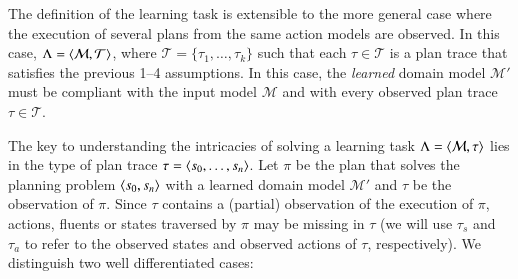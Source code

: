 The definition of the learning task is extensible to the more general case where the execution of several plans from the same action models are observed. In this case, $\Lambda={\langle \mathcal{M},\mathcal{T} \rangle}$, where $\mathcal{T}=\{\tau_1,\ldots,\tau_{k}\}$ such that each $\tau\in \mathcal{T}$ is a plan trace that satisfies the previous 1--4 assumptions. In this case, the {\em learned} domain model $\mathcal{M}'$ must be compliant with the input model $\mathcal{M}$ and with every observed plan trace $\tau\in \mathcal{T}$.

\vspace{0.15cm}

\textcolor[rgb]{1.00,0.00,0.00}{The key to understanding the intricacies of solving a learning task $\Lambda={\langle \mathcal{M},\tau \rangle}$ lies in the type of plan trace $\tau = {\langle s_0, \ldots, s_n \rangle}$. Let $\pi$ be the plan that solves the planning problem ${\langle s_0,s_n \rangle}$ with a learned domain model $\mathcal{M}'$ and $\tau$ be the observation of $\pi$. Since $\tau$ contains a (partial) observation of the execution of $\pi$, actions, fluents or states traversed by $\pi$ may be missing in $\tau$ (we will use $\tau_s$ and $\tau_a$ to refer to the observed states and observed actions of $\tau$, respectively). We distinguish two well differentiated cases:}

